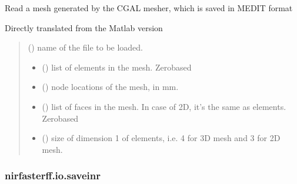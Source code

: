 \documentclass[letterpaper,10pt,english]{sphinxmanual}
\begin{document}
\begin{fulllineitems}
\label{\detokenize{_autosummary/nirfasterff.io.readMEDIT:nirfasterff.io.readMEDIT}}
\pysigstartsignatures
\pysiglinewithargsret
{}
{}
{}
\pysigstopsignatures
\sphinxAtStartPar
Read a mesh generated by the CGAL mesher, which is saved in MEDIT format

\sphinxAtStartPar
Directly translated from the Matlab version
\begin{quote}\begin{description}
\sphinxAtStartPar
{} () \textendash{} name of the file to be loaded.

\sphinxAtStartPar
\begin{itemize}
\item {} 
\sphinxAtStartPar
{} () \textendash{} list of elements in the mesh. Zero\sphinxhyphen{}based

\item {} 
\sphinxAtStartPar
{} () \textendash{} node locations of the mesh, in mm.

\item {} 
\sphinxAtStartPar
{} () \textendash{} list of faces in the mesh. In case of 2D, it’s the same as elements. Zero\sphinxhyphen{}based

\item {} 
\sphinxAtStartPar
{} () \textendash{} size of dimension 1 of elements, i.e. 4 for 3D mesh and 3 for 2D mesh.

\end{itemize}


\end{description}\end{quote}

\end{fulllineitems}


\sphinxstepscope


\subsubsection{nirfasterff.io.saveinr}
\label{\detokenize{_autosummary/nirfasterff.io.saveinr:nirfasterff-io-saveinr}}\label{\detokenize{_autosummary/nirfasterff.io.saveinr::doc}}
\end{document}
